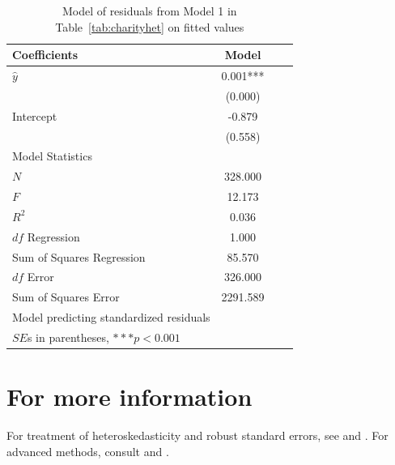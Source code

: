 \begin{table}[htbp]\centering
\caption{Model of residuals from Model 1 in Table~\ref{tab:charityhet} on fitted values
\label{tab:charityresid}}
\begin{tabular}{lccc}
\hline
Coefficients&Model \\
\hline
$\hat{y}$   &    0.001***\\
      &   (0.000)  \\
Intercept    &   -0.879  \\
      &   (0.558)  \\
\hline
\multicolumn{1}{l}{Model Statistics} \\
\hline
$N$ 				 &   328.000  \\
$F$ 				 &   12.173  \\
$R^2$ 			  &    0.036  \\
$df$ Regression 	 &    1.000  \\
Sum of Squares Regression 	 &   85.570  \\
$df$ Error 			 &   326.000  \\
Sum of Squares Error 	 &  2291.589  \\
\hline
\multicolumn{1}{l}{Model predicting standardized residuals} \\
\multicolumn{1}{l}{$SE$s in parentheses, $***p<0.001$} \\
\hline
\end{tabular}
\end{table}

\section*{For more information}
For treatment of heteroskedasticity and robust standard errors, see \citep{hill} and \citep{fox}. For advanced methods, consult \citep{cameron2005microeconometrics} and \citep{freedman2008weighting}.

